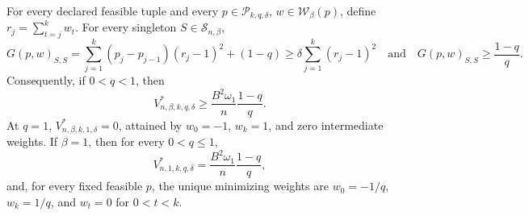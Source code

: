 For every declared feasible tuple and every \(p\in\mathcal P_{k,q,\delta}\), \(w\in\mathcal W_\beta(p)\), define \(r_j=\sum_{t=j}^kw_t\).  For every singleton \(S\in\mathcal S_{n,\beta}\),
\[
G(p,w)_{S,S}=\sum_{j=1}^k(p_j-p_{j-1})(r_j-1)^2+(1-q)
\ge\delta\sum_{j=1}^k(r_j-1)^2
\quad\text{and}\quad
G(p,w)_{S,S}\ge\frac{1-q}{q}.
\]
Consequently, if \(0<q<1\), then
\[
V^*_{n,\beta,k,q,\delta}\ge
\frac{B^2\omega_1}{n}\frac{1-q}{q}.
\]
At \(q=1\), \(V^*_{n,\beta,k,1,\delta}=0\), attained by \(w_0=-1\), \(w_k=1\), and zero intermediate weights.  If \(\beta=1\), then for every \(0<q\le1\),
\[
V^*_{n,1,k,q,\delta}=\frac{B^2\omega_1}{n}\frac{1-q}{q},
\]
and, for every fixed feasible \(p\), the unique minimizing weights are \(w_0=-1/q\), \(w_k=1/q\), and \(w_t=0\) for \(0<t<k\).